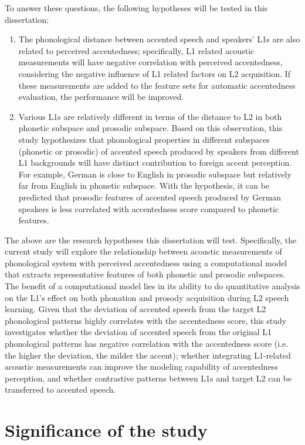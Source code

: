 To answer these questions, the following hypotheses will be tested in this dissertation:
\begin{enumerate}
\item The phonological distance between accented speech and speakers' L1s are also related to perceived accentedness; specifically, L1 related acoustic measurements will have negative correlation with perceived accentedness, considering the negative influence of L1 related factors on L2 acquisition. If these measurements are added to the feature sets for automatic accentedness evaluation, the performance will be improved.
\item Various L1s are relatively different in terms of the distance to L2 in both phonetic subspace and prosodic subspace. Based on this observation, this study hypothesizes that phonological properties in different subspaces (phonetic or prosodic) of accented speech produced by speakers from different L1 backgrounds will have distinct contribution to foreign accent perception. For example, German is close to English in prosodic subspace but relatively far from English in phonetic subspace. With the hypothesis, it can be predicted that prosodic features of accented speech produced by German speakers is less correlated with accentedness score compared to phonetic features.
\end{enumerate}

The above are the research hypotheses this dissertation will test. Specifically, the current study will explore the relationship between acoustic measurements of phonological system with perceived accentedness using a computational model that extracts representative features of both phonetic and prosodic subspaces. The benefit of a computational model lies in its ability to do quantitative analysis on the L1's effect on both phonation and prosody acquisition during L2 speech learning. Given that the deviation of accented speech from the target L2 phonological patterns highly correlates with the accentedness score, this study investigates whether the deviation of accented speech from the original L1 phonological patterns has negative correlation with the accentedness score (i.e. the higher the deviation, the milder the accent); whether integrating L1-related acoustic measurements can improve the modeling capability of accentedness perception, and whether contrastive patterns between L1s and target L2 can be transferred to accented speech.

\section{Significance of the study}

